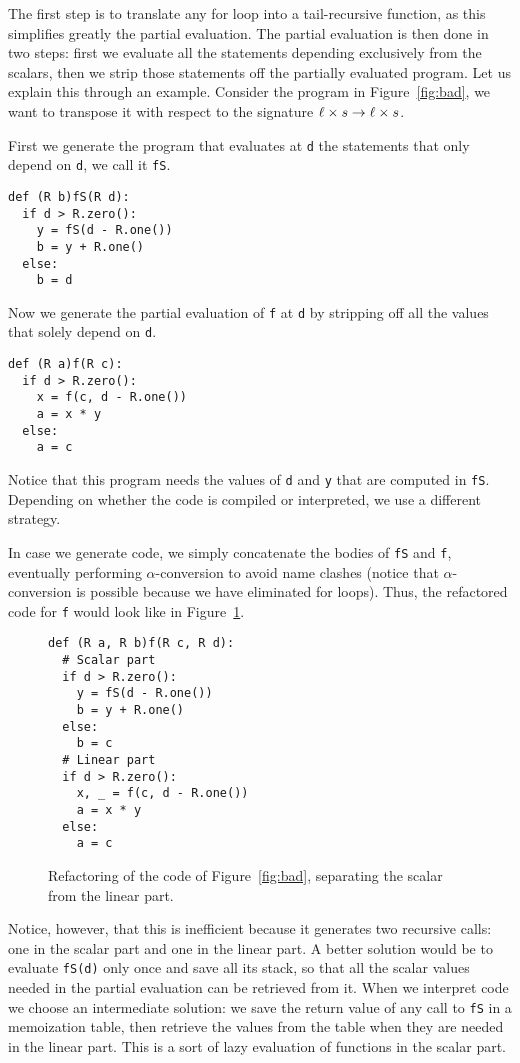 The first step is to translate any for loop into a tail-recursive
function, as this simplifies greatly the partial evaluation. The
partial evaluation is then done in two steps: first we evaluate all
the statements depending exclusively from the scalars, then we strip
those statements off the partially evaluated program. Let us explain
this through an example. Consider the program in Figure~\ref{fig:bad},
we want to transpose it with respect to the signature $\ell\times
s\rightarrow\ell\times s$.

First we generate the program that evaluates at \lstinline+d+ the
statements that only depend on \lstinline+d+, we call it
\lstinline+fS+.
\begin{lstlisting}
def (R b)fS(R d):
  if d > R.zero():
    y = fS(d - R.one())
    b = y + R.one()
  else:
    b = d
\end{lstlisting}

Now we generate the partial evaluation of \lstinline+f+ at
\lstinline+d+ by stripping off all the values that solely depend on
\lstinline+d+.
\begin{lstlisting}
def (R a)f(R c):
  if d > R.zero():
    x = f(c, d - R.one())
    a = x * y
  else:
    a = c
\end{lstlisting}
Notice that this program needs the values of \lstinline+d+ and
\lstinline+y+ that are computed in \lstinline+fS+. Depending on
whether the code is compiled or interpreted, we use a different
strategy.

In case we generate code, we simply concatenate the bodies of
\lstinline+fS+ and \lstinline+f+, eventually performing
$\alpha$-conversion to avoid name clashes (notice that
$\alpha$-conversion is possible because we have eliminated for
loops). Thus, the refactored code for \lstinline+f+ would look like in
Figure~\ref{fig:bad-ref}.

\begin{figure}[t]
  \centering
\begin{lstlisting}[frame=single,frameround=tttt]
def (R a, R b)f(R c, R d):
  # Scalar part
  if d > R.zero():
    y = fS(d - R.one())
    b = y + R.one()
  else:
    b = c
  # Linear part
  if d > R.zero():
    x, _ = f(c, d - R.one())
    a = x * y
  else:
    a = c
\end{lstlisting}
  \caption{\label{fig:bad-ref}Refactoring of the code of
    Figure~\ref{fig:bad}, separating the scalar from the linear part.}
\end{figure}


Notice, however, that this is inefficient because it generates two
recursive calls: one in the scalar part and one in the linear part. A
better solution would be to evaluate \lstinline+fS(d)+ only once and
save all its stack, so that all the scalar values needed in the
partial evaluation can be retrieved from it. When we interpret code we
choose an intermediate solution: we save the return value of any call
to \lstinline+fS+ in a memoization table, then retrieve the values
from the table when they are needed in the linear part. This is a sort
of lazy evaluation of functions in the scalar part.

